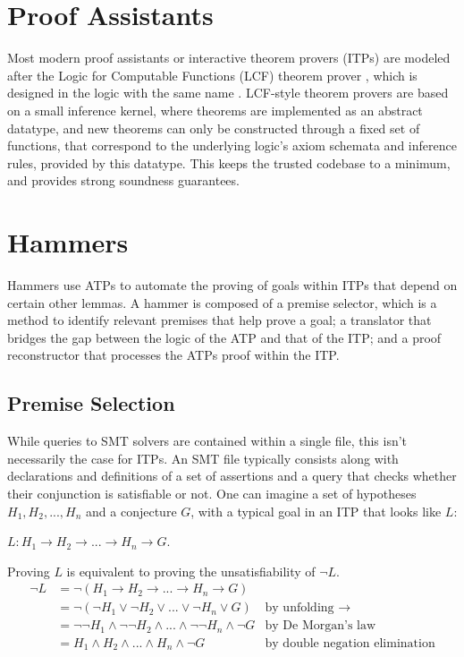 \documentclass{article}
\begin{document}
\section{Proof Assistants}
\label{sec:itp}
	Most modern proof assistants or interactive 
	theorem provers (ITPs) are modeled after 
	the Logic for Computable Functions (LCF) theorem
	prover \cite{10.5555/891954}, which is designed 
	in the logic with the same name
	\cite{Loeckx1987}. LCF-style theorem provers are 
	based on a small inference kernel, where theorems 
	are implemented as an abstract datatype, and 
	new theorems can only be constructed through a 
	fixed set of functions, that correspond to the 
	underlying logic's axiom schemata and inference 
	rules, provided by this datatype. This keeps
	the trusted codebase to a minimum, and 
	provides strong soundness guarantees.
	
\section{Hammers}
\label{sec:hammer}
	Hammers use ATPs to automate the proving of goals within ITPs
	that depend on certain other lemmas. A hammer is composed of 
	a premise selector, which is a method to identify relevant 
	premises that help prove a goal; a translator that bridges 
	the gap between the logic of the ATP and that of the ITP; 
	and a proof reconstructor that processes the ATPs proof
	within the ITP.
	
	\subsection{Premise Selection}
		While queries to SMT solvers are contained within a single 
		file, this isn't necessarily the case for ITPs. An SMT file
		typically consists along with declarations and definitions 
		of a set of assertions and a query that checks whether 
		their conjunction is satisfiable or not. 
		One can imagine a set of hypotheses 
		$H_1, H_2, ..., H_n$ and a conjecture $G$, with a 
		typical goal in an ITP that looks like $L$:
		\begin{center}
			$L : H_1 \to H_2 \to ... \to H_n \to G$.
		\end{center}
		Proving $L$ is equivalent to proving the unsatisfiability 
		of $\neg L$.
		\begin{align*}
			\neg L &= \neg (H_1 \to H_2 \to ... \to H_n \to G)\\
			&= \neg (\neg H_1 \lor \neg H_2 \lor ... \lor \neg H_n \lor G)
			& \text{by unfolding }\to \\
			&= \neg \neg H_1 \land \neg \neg H_2 \land ... \land \neg \neg H_n 
			\land \neg G
			& \text{by De Morgan's law}\\
			&= H_1 \land H_2 \land ... \land H_n \land \neg G
			& \text{by double negation elimination}
		\end{align*}
	
\end{document}
